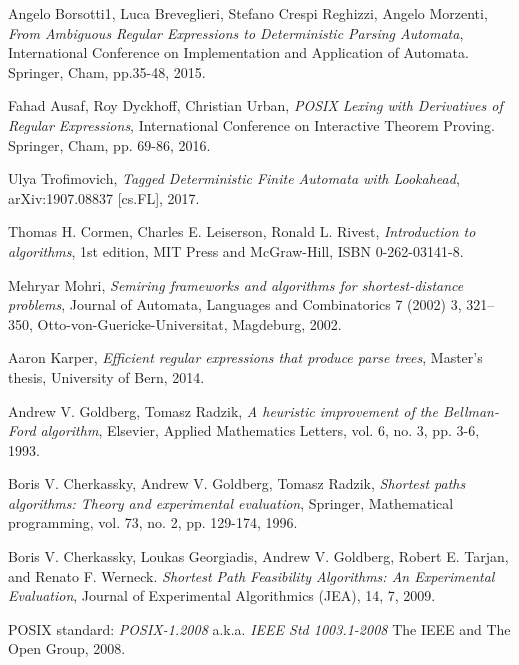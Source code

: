 \documentclass[AMA,STIX1COL]{WileyNJD-v2}
\begin{document}
\begin{thebibliography}{99}
    Angelo Borsotti1, Luca Breveglieri, Stefano Crespi Reghizzi, Angelo Morzenti,
    \textit{From Ambiguous Regular Expressions to Deterministic Parsing Automata},
    International Conference on Implementation and Application of Automata. Springer, Cham, pp.35-48,
    2015.

    Fahad Ausaf, Roy Dyckhoff, Christian Urban,
    \textit{POSIX Lexing with Derivatives of Regular Expressions},
    International Conference on Interactive Theorem Proving. Springer, Cham, pp. 69-86,
    2016.

    Ulya Trofimovich,
    \textit{Tagged Deterministic Finite Automata with Lookahead},
    arXiv:1907.08837 [cs.FL],
    2017.

    Thomas H. Cormen, Charles E. Leiserson, Ronald L. Rivest,
    \textit{Introduction to algorithms},
    1st edition,
    MIT Press and McGraw-Hill,
    ISBN 0-262-03141-8.

    Mehryar Mohri,
    \textit{Semiring frameworks and algorithms for shortest-distance problems},
    Journal of Automata, Languages and Combinatorics 7 (2002) 3, 321–350, Otto-von-Guericke-Universitat, Magdeburg,
    2002.

    Aaron Karper,
    \textit{Efficient regular expressions that produce parse trees},
    Master's thesis,
    University of Bern,
    2014.

    Andrew V. Goldberg, Tomasz Radzik,
    \textit{A heuristic improvement of the Bellman-Ford algorithm},
    Elsevier, Applied Mathematics Letters, vol. 6, no. 3, pp. 3-6,
    1993.

    Boris V. Cherkassky, Andrew V. Goldberg, Tomasz Radzik,
    \textit{Shortest paths algorithms: Theory and experimental evaluation},
    Springer, Mathematical programming, vol. 73, no. 2, pp. 129-174,
    1996.

    Boris V. Cherkassky, Loukas Georgiadis, Andrew V. Goldberg, Robert E. Tarjan, and Renato F. Werneck.
    \textit{Shortest Path Feasibility Algorithms: An Experimental Evaluation},
    Journal of Experimental Algorithmics (JEA), 14, 7,
    2009.

    POSIX standard: \textit{POSIX-1.2008}
    a.k.a. \textit{IEEE Std 1003.1-2008}
    The IEEE and The Open Group,
    2008.


\end{thebibliography}
\end{document}
